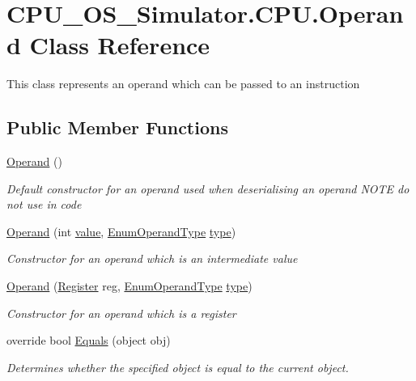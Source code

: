 \hypertarget{class_c_p_u___o_s___simulator_1_1_c_p_u_1_1_operand}{}\section{C\+P\+U\+\_\+\+O\+S\+\_\+\+Simulator.\+C\+P\+U.\+Operand Class Reference}
\label{class_c_p_u___o_s___simulator_1_1_c_p_u_1_1_operand}


This class represents an operand which can be passed to an instruction  


\subsection*{Public Member Functions}
\begin{DoxyCompactItemize}
\item 
\hyperlink{class_c_p_u___o_s___simulator_1_1_c_p_u_1_1_operand_a8f6d642c2e5741c17748379c34a3052c}{Operand} ()
\begin{DoxyCompactList}\small\item\em Default constructor for an operand used when deserialising an operand N\+O\+T\+E do not use in code \end{DoxyCompactList}\item 
\hyperlink{class_c_p_u___o_s___simulator_1_1_c_p_u_1_1_operand_aaa8877bd8c0018697f49c9f764fbe750}{Operand} (int \hyperlink{class_c_p_u___o_s___simulator_1_1_c_p_u_1_1_operand_a59d05c39a45091805c9506b1852f9bde}{value}, \hyperlink{namespace_c_p_u___o_s___simulator_1_1_c_p_u_ad49cfe442b74115a326c03b7ae848f76}{Enum\+Operand\+Type} \hyperlink{class_c_p_u___o_s___simulator_1_1_c_p_u_1_1_operand_abc8f504a22e9a5c49d91b12f61cc5119}{type})
\begin{DoxyCompactList}\small\item\em Constructor for an operand which is an intermediate value \end{DoxyCompactList}\item 
\hyperlink{class_c_p_u___o_s___simulator_1_1_c_p_u_1_1_operand_ab1da49c3f7978edcfa8c9b95e5804f08}{Operand} (\hyperlink{class_c_p_u___o_s___simulator_1_1_c_p_u_1_1_register}{Register} reg, \hyperlink{namespace_c_p_u___o_s___simulator_1_1_c_p_u_ad49cfe442b74115a326c03b7ae848f76}{Enum\+Operand\+Type} \hyperlink{class_c_p_u___o_s___simulator_1_1_c_p_u_1_1_operand_abc8f504a22e9a5c49d91b12f61cc5119}{type})
\begin{DoxyCompactList}\small\item\em Constructor for an operand which is a register \end{DoxyCompactList}\item 
override bool \hyperlink{class_c_p_u___o_s___simulator_1_1_c_p_u_1_1_operand_ac169b353cb0758a106813a77caa5fc18}{Equals} (object obj)
\begin{DoxyCompactList}\small\item\em Determines whether the specified object is equal to the current object. \end{DoxyCompactList}\end{DoxyCompactItemize}
